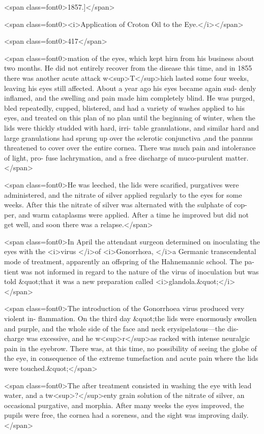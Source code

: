 <span class=font0>1857.]</span>

<span class=font0><i>Application of Croton Oil to the Eye.</i></span>

<span class=font0>417</span>

<span class=font0>mation of the eyes, which kept hirn from his business about two months.
He did not entirely recover from the disease this time, and in 1855
there was another acute attack w<sup>T</sup>hich lasted some four weeks, leaving
his eyes still affected. About a year ago his eyes became again sud-
denly inflamed, and the swelling and pain made him completely blind.
He was purged, bled repeatedly, cupped, blistered, and had a variety of
washes applied to his eyes, and treated on this plan of no plan until the
beginning of winter, when the lids were thickly studded with hard, irri-
table granulations, and similar hard and large granulations had sprung
up over the sclerotic conjunctiva ,and the pannus threatened to cover over
the entire cornea. There was much pain and intolerance of light, pro-
fuse lachrymation, and a free discharge of muco-purulent matter.</span>

<span class=font0>He was leeched, the lids were scarified, purgatives were administered,
and the nitrate of silver applied regularly to the eyes for some weeks.
After this the nitrate of silver was alternated with the sulphate of cop-
per, and warm cataplasms were applied. After a time he improved
but did not get well, and soon there was a relapse.</span>

<span class=font0>In April the attendant surgeon determined on inoculating the eyes
with the <i>virus </i>of <i>Gonorrhœa, </i>a Germanic transcendental mode of
treatment, apparently an offspring of the Hahnemannic school. The pa-
tient was not informed in regard to the nature of the virus of inoculation
but was told &quot;that it was a new preparation called <i>glandola.&quot;</i></span>

<span class=font0>The introduction of the Gonorrhoea virus produced very violent in-
flammation. On the third day &quot;the lids were enormously swollen and
purple, and the whole side of the face and neck erysipelatous---the dis-
charge was excessive, and he w<sup>r</sup>as racked with intense neuralgic pain in
the eyebrow. There was, at this time, no possibility of seeing the globe of
the eye, in consequence of the extreme tumefaction and acute pain
where the lids were touched.&quot;</span>

<span class=font0>The after treatment consisted in washing the eye with lead water, and
a tw<sup>?</sup>enty grain solution of the nitrate of silver, an occasional purgative,
and morphia. After many weeks the eyes improved, the pupils were
free, the cornea had a soreness, and the sight was improving daily.</span>

